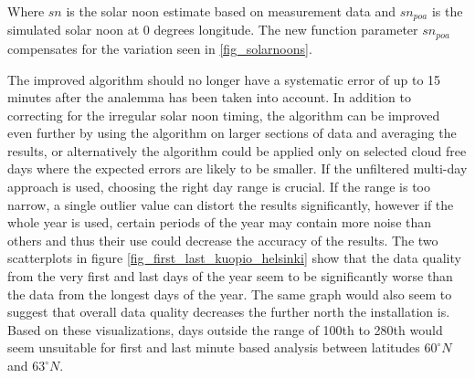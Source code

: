 \noindent Where $sn$ is the solar noon estimate based on measurement data and $sn_{poa}$ is the simulated solar noon at 0 degrees longitude. The new function parameter $sn_{poa}$ compensates for the variation seen in \ref{fig_solarnoons}.



\vspace{5mm}


\noindent



\vspace{0.5cm}
\noindent The improved algorithm should no longer have a systematic error of up to 15 minutes after the analemma has been taken into account. In addition to correcting for the irregular solar noon timing, the algorithm can be improved even further by using the algorithm on larger sections of data and averaging the results, or alternatively the algorithm could be applied only on selected cloud free days where the expected errors are likely to be smaller. If the unfiltered multi-day approach is used, choosing the right day range is crucial. If the range is too narrow, a single outlier value can distort the results significantly, however if the whole year is used, certain periods of the year may contain more noise than others and thus their use could decrease the accuracy of the results. The two scatterplots in figure \ref{fig_first_last_kuopio_helsinki} show that the data quality from the very first and last days of the year seem to be significantly worse than the data from the longest days of the year. The same graph would also seem to suggest that overall data quality decreases the further north the installation is. Based on these visualizations, days outside the range of 100th to 280th would seem unsuitable for first and last minute based analysis between latitudes $60^\circ N$ and $63^\circ N$. 

